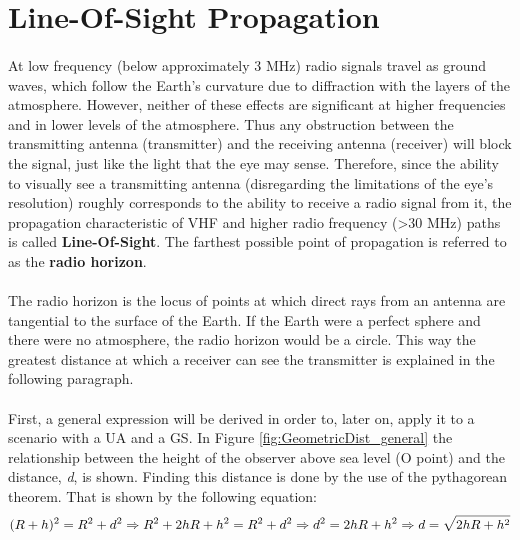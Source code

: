 \section{Line-Of-Sight Propagation}\label{subsec:los_propagation}
\paragraph{}At low frequency (below approximately 3 MHz) radio signals travel as ground waves, which follow the Earth's curvature due to diffraction with the layers of the atmosphere.
However, neither of these effects are significant at higher frequencies and in lower levels of the atmosphere. Thus any obstruction between the transmitting antenna (transmitter) and the receiving antenna (receiver) will block the signal, just like the light that the eye may sense. Therefore, since the ability to visually see a transmitting antenna (disregarding the limitations of the eye's resolution) roughly corresponds to the ability to receive a radio signal from it, the propagation characteristic of VHF and higher radio frequency (>30 MHz) paths is called \textbf{Line-Of-Sight}. The farthest possible point of propagation is referred to as the \textbf{radio horizon}.

\paragraph{}The radio horizon is the locus of points at which direct rays from an antenna are tangential to the surface of the Earth. If the Earth were a perfect sphere and there were no atmosphere, the radio horizon would be a circle.
This way the greatest distance at which a receiver can see the transmitter is explained in the following paragraph.

\paragraph{}First, a general expression will be derived in order to, later on, apply it to a scenario with a UA and a GS. In Figure \ref{fig:GeometricDist_general} the relationship between the height of the observer above sea level (O point) and the distance, \textit{d}, is shown. Finding this distance is done by the use of the pythagorean theorem. That is shown by the following equation:
\begin{equation}\label{eq:los_distToHorizon}
	(R+h)^2 = R^2+d^2\nonumber \\
	\Rightarrow R^2+2hR+h^2 = R^2+d^2 \Rightarrow d^2 = 2hR + h^2 \\
	\Rightarrow d = \sqrt{2hR + h^2}
\end{equation} 

